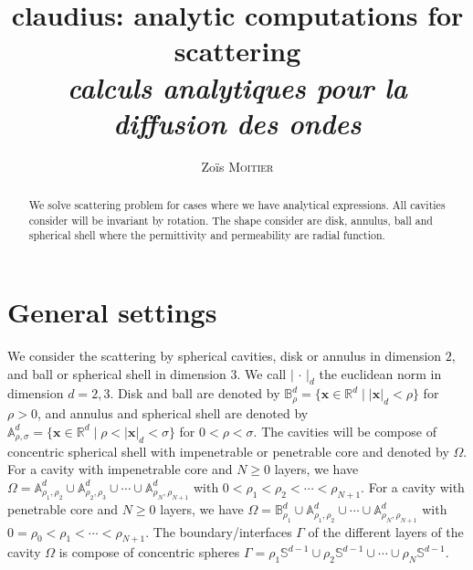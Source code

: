 \documentclass[12pt,a4paper]{article}
\title{claudius: analytic computations for scattering \\ \Large \emph{calculs analytiques pour la diffusion des ondes}}
\author{Zoïs \textsc{Moitier}}
\theoremstyle{definition}
\theoremstyle{plain}
\theoremstyle{remark}
\newcommand{\bbA}{\mathbb{A}}
\newcommand{\bbB}{\mathbb{B}}
\newcommand{\bbR}{\mathbb{R}}
\newcommand{\bbS}{\mathbb{S}}
\newcommand{\abs}[1]{\left\lvert#1\right\rvert}
\newcommand{\vx}{\boldsymbol{x}}
\begin{document}
\maketitle

\begin{abstract}
    We solve scattering problem for cases where we have analytical expressions.
    All cavities consider will be invariant by rotation.
    The shape consider are disk, annulus, ball and spherical shell where the permittivity and permeability are radial function.
\end{abstract}

\tableofcontents

\section{General settings}

We consider the scattering by spherical cavities, disk or annulus in dimension \(2\), and ball or spherical shell in dimension \(3\).
We call \(\abs{\,\cdot\,}_d\) the euclidean norm in dimension \(d = 2, 3\).
Disk and ball are denoted by \(\bbB_\rho^d = \{\vx \in \bbR^d \mid \abs{\vx}_d < \rho\}\) for \(\rho > 0\), and annulus and spherical shell are denoted by \(\bbA_{\rho, \sigma}^d = \{\vx \in \bbR^d \mid \rho < \abs{\vx}_d < \sigma\}\) for \(0 < \rho < \sigma\).
The cavities will be compose of concentric spherical shell with impenetrable or penetrable core and denoted by \(\Omega\).
For a cavity with impenetrable core and \(N \ge 0\) layers, we have \(\Omega = \bbA_{\rho_1, \rho_2}^d \cup \bbA_{\rho_2, \rho_3}^d \cup \cdots \cup \bbA_{\rho_N, \rho_{N+1}}^d\) with \(0 < \rho_1 < \rho_2 < \cdots < \rho_{N+1}\).
For a cavity with penetrable core and \(N \ge 0\) layers, we have \(\Omega = \bbB_{\rho_1}^d \cup \bbA_{\rho_1, \rho_2}^d \cup \cdots \cup \bbA_{\rho_N, \rho_{N+1}}^d\) with \(0 = \rho_0 < \rho_1 < \cdots < \rho_{N+1}\).
The boundary/interfaces \(\Gamma\) of the different layers of the cavity \(\Omega\) is compose of concentric spheres \(\Gamma = \rho_1\bbS^{d-1} \cup \rho_2\bbS^{d-1} \cup \cdots \cup \rho_N\bbS^{d-1}\).

\bigskip
\end{document}
